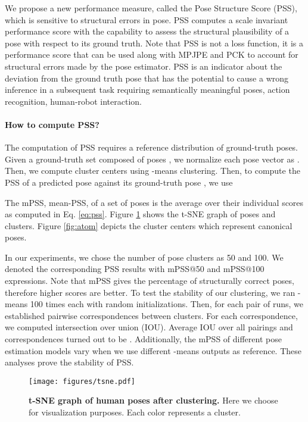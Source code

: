 \documentclass[10pt,twocolumn,letterpaper]{article}
\begin{document}
We propose a new performance measure, called the Pose Structure Score (PSS), which is sensitive to structural errors in pose. PSS computes a scale invariant performance score with the capability to assess the structural plausibility of a pose with respect to its ground truth. Note that PSS is not a loss function, it is a performance score that can be used along with MPJPE and PCK to account for structural errors made by the  pose estimator. PSS is an indicator about the deviation from the ground truth pose that has the potential to cause a wrong inference in a subsequent task requiring semantically meaningful poses, \eg action recognition, human-robot interaction.

\paragraph{How to compute PSS?} The computation of PSS requires a reference distribution of ground-truth poses. Given a ground-truth set composed of  poses , we normalize each pose vector as . Then, we compute   cluster centers  using -means clustering.
Then, to compute the PSS of a predicted pose  against its ground-truth pose , we use 



The mPSS, mean-PSS, of a set of poses is the average over their individual scores as computed in Eq. \eqref{eq:pss}. Figure \ref{fig:tsne} shows the t-SNE \cite{tsne} graph of poses and clusters. Figure \ref{fig:atom} depicts the cluster centers which represent canonical poses.

In our experiments, we chose the number of pose clusters as 50 and 100. We denoted the corresponding PSS results with mPSS@50 and mPSS@100 expressions. Note that mPSS gives the percentage of structurally correct poses, therefore higher scores are better. To test the stability of our clustering, we ran -means 100 times each with random initializations. Then, for each pair of runs, we established pairwise correspondences between clusters. For each correspondence, we computed intersection over union (IOU). Average IOU over all pairings and correspondences turned out to be . Additionally, the mPSS of different pose estimation models vary  when we use different -means outputs as reference. These analyses prove the stability of PSS.

\begin{figure}
\centering
\texttt{[image: figures/tsne.pdf]}
\caption{\textbf{t-SNE graph of human poses after clustering.} Here we choose  for visualization purposes. Each color represents a cluster.}
\label{fig:tsne}
\end{figure}
\end{document}
